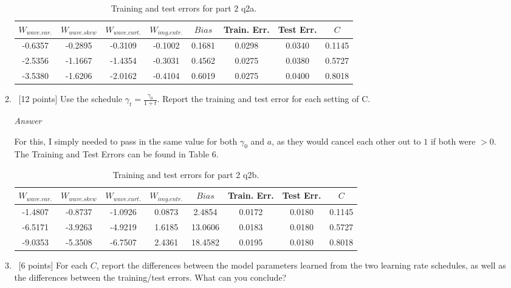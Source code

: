 \documentclass[12pt, fullpage,letterpaper]{article}
\begin{document}
\begin{enumerate}
\begin{enumerate}
		\begin{table}[h]
    		\centering
    		\begin{tabular}{ccccccc|c}
        		$W_{wave.var.}$ & $W_{wave.skew}$ & $W_{wave.curt.}$ & $W_{img.entr.}$ & $Bias$ & Train. Err. & Test Err. & $C$ \\
        		\hline\hline
                -0.6357 & -0.2895 & -0.3109 & -0.1002 & 0.1681 & 0.0298 & 0.0340 & 0.1145 \\ \hline
                -2.5356 & -1.1667 & -1.4354 & -0.3031 & 0.4562 & 0.0275 & 0.0380 & 0.5727 \\ \hline
                -3.5380 & -1.6206 & -2.0162 & -0.4104 & 0.6019 & 0.0275 & 0.0400 & 0.8018 \\ \hline
    		\end{tabular}
    	\caption{Training and test errors for part 2 q2a.}
    	\end{table}
		
		\item~[12 points] Use the schedule $\gamma_t = \frac{\gamma_0}{1+t}$. Report the training and test error for each setting of C. 
		
		\emph{Answer}
		
		For this, I simply needed to pass in the same value for both $\gamma_0$ and $a$, as they would cancel each other out to $1$ if both were $>0$. The Training and Test Errors can be found in Table 6.
		
		\begin{table}[h]
    		\centering
    		\begin{tabular}{ccccccc|c}
        		$W_{wave.var.}$ & $W_{wave.skew}$ & $W_{wave.curt.}$ & $W_{img.entr.}$ & $Bias$ & Train. Err. & Test Err. & $C$ \\
        		\hline\hline
                -1.4807 & -0.8737 & -1.0926 & 0.0873 & 2.4854  & 0.0172 & 0.0180 & 0.1145 \\ \hline
                -6.5171 & -3.9263 & -4.9219 & 1.6185 & 13.0606 & 0.0183 & 0.0180 & 0.5727 \\ \hline
                -9.0353 & -5.3508 & -6.7507 & 2.4361 & 18.4582 & 0.0195 & 0.0180 & 0.8018 \\ \hline
    		\end{tabular}
    	\caption{Training and test errors for part 2 q2b.}
    	\end{table}
		
		\item~[6 points] For each $C$, report the differences between the model parameters learned from the two learning rate schedules, as well as the differences between the training/test errors. What can you conclude? 
		

\end{enumerate}
\end{enumerate}
\end{document}
